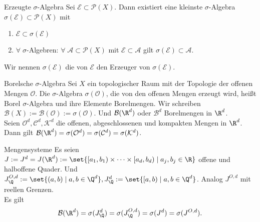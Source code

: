 \begin{karte}{Erzeugte \(\sigma\)-Algebra}
	Sei \( \mathcal{E} \subset \mathcal{P}(X) \). Dann existiert eine kleinste \(\sigma\)-Algebra \( \sigma(\mathcal{E}) \subset \mathcal{P}(X) \) mit 
	\begin{enumerate}
		\item \(\mathcal{E} \subset \sigma(\mathcal{E})\)
		\item \(\forall\; \sigma\)-Algebren: \(\forall \; \mathcal{A} \subset \mathcal{P}(X) \) mit \( \mathcal{E} \subset \mathcal{A} \) gilt \(\sigma(\mathcal{E}) \subset \mathcal{A}\).
	\end{enumerate}
	Wir nennen \(\sigma(\mathcal{E})\) die von \(\mathcal{E}\) den Erzeuger von \(\sigma(\mathcal{E})\).
\end{karte}

\begin{karte}{Borelsche \(\sigma\)-Algebra}
	Sei \(X\) ein topologischer Raum mit der Topologie der offenen Mengen \(\mathcal{O}\). 
	Die \(\sigma\)-Algebra \(\sigma(\mathcal{O})\), 
	die von den offenen Mengen erzeugt wird, heißt Borel \(\sigma\)-Algebra und ihre Elemente Borelmengen. 
	Wir schreiben \(\mathcal{B}(X) := \mathcal{B}(\mathcal{O}) := \sigma(\mathcal{O})\). 
	Und \(\mathcal{B}(\R^d)\) oder \(\mathcal{B}^d\) 
	Borelmengen in \(\R^d\).\\
	Seien \( \mathcal{O}^d, \mathcal{C}^d, \mathcal{K}^d \) die offenen, abgeschlossenen und kompakten Mengen in \(\R^d\). 
	Dann gilt \( \mathcal{B}(\R^d) = \sigma(\mathcal{O}^d) = \sigma(\mathcal{C}^d) = \sigma(\mathcal{K}^d) \).
\end{karte}

\begin{karte}{Mengensysteme}
	Es seien \( J := J^d = J(\R^d) := \set{ [a_1,b_1) \times \cdots \times [a_d,b_d) \;|\; a_j, b_j \in \R } \) offene und halboffene Quader.
	Und \( J_\Q^{O,d} := \set{(a,b) \;|\; a,b\in \Q^d}, J_\Q^d := \set{ [a,b) \;|\; a,b\in \Q^d } \). Analog \(J^{O,d}\) mit reellen Grenzen. \\
	Es gilt 
	\[ \mathcal{B}(\R^d) = \sigma(J_\Q^d) = \sigma(J_\Q^{O,d}) = \sigma(J^d) = \sigma(J^{O,d}). \]
\end{karte}